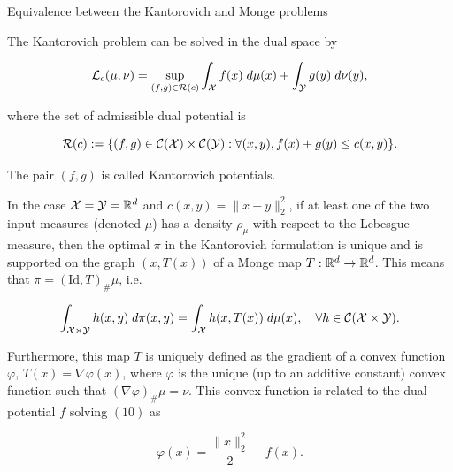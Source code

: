 \begin{frame}{Equivalence between the Kantorovich and Monge problems}
    \scriptsize
    \vspace{-.6em}
    \begin{Thm}
        The Kantorovich problem can be solved in the dual space by

        \vspace{-.7em}
        \begin{equation}
            \mathcal{L}_c(\mu,\nu)=\sup_{(f,g)\in \mathcal{R}(c)} 
            \int_{\mathcal{X}} f(x)\;d\mu(x) + \int_{\mathcal{Y}} g(y)\;d\nu(y),
            \label{equ:KantorovichDual}
        \end{equation}

        \vspace{-.4em}
        where the set of admissible dual potential is

        \vspace{-.4em}
        \begin{equation}
            \mathcal{R}(c) := \{(f,g) \in \mathcal{C}(\mathcal{X})\times\mathcal{C}(\mathcal{Y}) : 
            \forall (x,y), f(x)+g(y)\leq c(x,y)\}.
        \end{equation}

        \vspace{-.4em}
        The pair $(f,g)$ is called Kantorovich potentials.
    \end{Thm}

    \pause
    \begin{Thm}
        In the case $\mathcal{X}=\mathcal{Y}=\mathbb{R}^d$ and $c(x, y) =\|x-y\|_2^2$, 
        if at least one of the two input measures (denoted $\mu$) 
        has a density $\rho_\mu$ with respect to the Lebesgue measure, 
        then the optimal $\pi$ in the Kantorovich formulation is unique 
        and is supported on the graph $(x, T (x))$ of a Monge map
        $T : \mathbb{R}^d \to \mathbb{R}^d$. This means that $\pi = (\text{Id}, T)_\#\mu$, 
        i.e.

        \vspace{-.4em}
        \begin{equation}
            \int_{\mathcal{X}\times \mathcal{Y}} h(x,y)\;d\pi(x,y)=\int_{\mathcal{X}} h(x,T(x))\;d\mu(x),
            \quad \forall h\in\mathcal{C}(\mathcal{X}\times \mathcal{Y}).
        \end{equation}

        \vspace{-.4em}
        Furthermore, this map $T$ is uniquely defined as the gradient 
        of a convex function $\varphi$, $T (x) = \nabla \varphi(x)$, 
        where $\varphi$ is the unique (up to an additive constant) convex 
        function such that $(\nabla\varphi)_\#\mu = \nu$. This convex 
        function is related to the dual potential $f$ solving 
        $(10)$ as

        \vspace{-.4em}
        \begin{equation}
            \varphi(x)=\frac{\| x\|_2^2}{2} - f(x).
        \end{equation}
    \end{Thm}
\end{frame}

